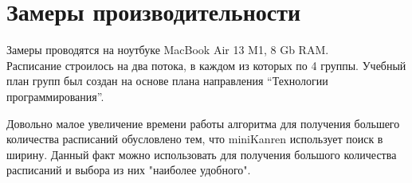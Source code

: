 
\section{Замеры производительности}

  
Замеры проводятся на ноутбуке MacBook Air 13 M1, 8 Gb RAM.\\
Расписание строилось на два потока, в каждом из которых по 4 группы. Учебный план групп был создан на основе плана направления ``Технологии программирования''.


 Довольно малое увеличение времени работы алгоритма для получения большего количества расписаний обусловлено тем, что miniKanren использует поиск в ширину. Данный факт можно использовать для получения большого количества расписаний и выбора из них "наиболее удобного".

